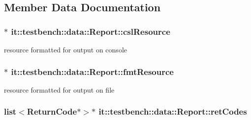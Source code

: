 \subsection{Member Data Documentation}
\hypertarget{classit_1_1testbench_1_1data_1_1Report_a922e94df83d2f49d39cf03c99f6e60ff}{
\subsubsection[{csl\-Resource}]{$\ast$ it\-::testbench\-::data\-::\-Report\-::csl\-Resource\hspace{0.3cm}{\ttfamily [private]}}}\label{d5/de8/classit_1_1testbench_1_1data_1_1Report_a922e94df83d2f49d39cf03c99f6e60ff}
resource formatted for output on console \hypertarget{classit_1_1testbench_1_1data_1_1Report_aecafa007878d7edeceaad1584d6f9914}{
\subsubsection[{fmt\-Resource}]{$\ast$ it\-::testbench\-::data\-::\-Report\-::fmt\-Resource\hspace{0.3cm}{\ttfamily [private]}}}\label{d5/de8/classit_1_1testbench_1_1data_1_1Report_aecafa007878d7edeceaad1584d6f9914}
resource formatted for output on file \hypertarget{classit_1_1testbench_1_1data_1_1Report_acc1760bcf43858c4413c6fe9b0e065f6}{
\subsubsection[{ret\-Codes}]{\setlength{\rightskip}{0pt plus 5cm}list$<${\bf Return\-Code}$\ast$$>$$\ast$ it\-::testbench\-::data\-::\-Report\-::ret\-Codes\hspace{0.3cm}{\ttfamily [private]}}}\label{d5/de8/classit_1_1testbench_1_1data_1_1Report_acc1760bcf43858c4413c6fe9b0e065f6}

